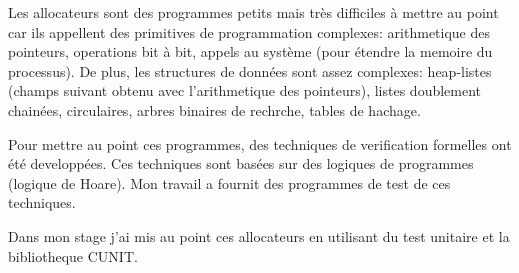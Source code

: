 Les allocateurs sont des programmes petits mais très difficiles à mettre au point car ils appellent des primitives de programmation complexes: arithmetique des pointeurs, operations bit à bit, appels au système (pour étendre la memoire du processus). De plus, les structures de données sont assez complexes: heap-listes (champs suivant obtenu avec l'arithmetique des pointeurs), listes doublement chainées, circulaires, arbres binaires de rechrche, tables de hachage. 

Pour mettre au point ces programmes, des techniques de verification formelles ont été developpées. Ces techniques sont basées sur des logiques de programmes (logique de Hoare). Mon travail a fournit des programmes de test de ces techniques.

Dans mon stage j'ai mis au point ces allocateurs en utilisant du test unitaire et la  bibliotheque CUNIT.
